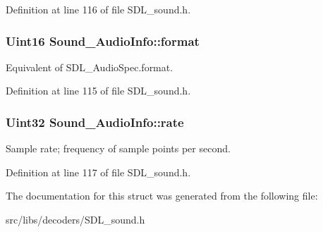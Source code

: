 Definition at line 116 of file S\-D\-L\-\_\-sound.\-h.

\hypertarget{structSound__AudioInfo_afc1f02fd774a0e1d35109360496390eb}{
\subsubsection[{format}]{\setlength{\rightskip}{0pt plus 5cm}Uint16 {\bf Sound\-\_\-\-Audio\-Info\-::format}}}\label{structSound__AudioInfo_afc1f02fd774a0e1d35109360496390eb}
Equivalent of S\-D\-L\-\_\-\-Audio\-Spec.\-format. 

Definition at line 115 of file S\-D\-L\-\_\-sound.\-h.

\hypertarget{structSound__AudioInfo_abc8310e37ae527e5d92e675655d944ee}{
\subsubsection[{rate}]{\setlength{\rightskip}{0pt plus 5cm}Uint32 {\bf Sound\-\_\-\-Audio\-Info\-::rate}}}\label{structSound__AudioInfo_abc8310e37ae527e5d92e675655d944ee}
Sample rate; frequency of sample points per second. 

Definition at line 117 of file S\-D\-L\-\_\-sound.\-h.



The documentation for this struct was generated from the following file\-:\begin{DoxyCompactItemize}
\item 
src/libs/decoders/S\-D\-L\-\_\-sound.\-h\end{DoxyCompactItemize}
